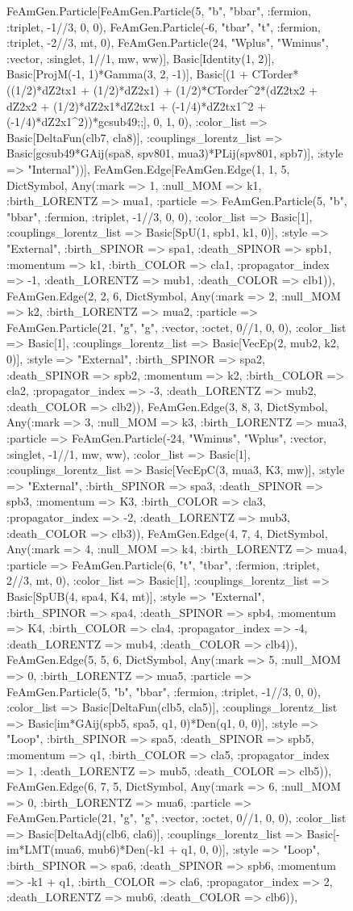\documentclass{revtex4}
\begin{document}
\begin{figure}[!htb]
\begin{center}
{FeAmGen.Particle[FeAmGen.Particle(5, "b", "bbar", :fermion, :triplet, -1//3, 0, 0), FeAmGen.Particle(-6, "tbar", "t", :fermion, :triplet, -2//3, mt, 0), FeAmGen.Particle(24, "Wplus", "Wminus", :vector, :singlet, 1//1, mw, ww)], Basic[Identity(1, 2)], Basic[ProjM(-1, 1)*Gamma(3, 2, -1)], Basic[(1 + CTorder*((1/2)*dZ2tx1 + (1/2)*dZ2x1) + (1/2)*CTorder^2*(dZ2tx2 + dZ2x2 + (1/2)*dZ2x1*dZ2tx1 + (-1/4)*dZ2tx1^2 + (-1/4)*dZ2x1^2))*gcsub49;;], 0, 1, 0), :color_list => Basic[DeltaFun(clb7, cla8)], :couplings_lorentz_list => Basic[gcsub49*GAij(spa8, spv801, mua3)*PLij(spv801, spb7)], :style => "Internal"))], FeAmGen.Edge[FeAmGen.Edge(1, 1, 5, Dict{Symbol, Any}(:mark => 1, :null_MOM => k1, :birth_LORENTZ => mua1, :particle => FeAmGen.Particle(5, "b", "bbar", :fermion, :triplet, -1//3, 0, 0), :color_list => Basic[1], :couplings_lorentz_list => Basic[SpU(1, spb1, k1, 0)], :style => "External", :birth_SPINOR => spa1, :death_SPINOR => spb1, :momentum => k1, :birth_COLOR => cla1, :propagator_index => -1, :death_LORENTZ => mub1, :death_COLOR => clb1)), FeAmGen.Edge(2, 2, 6, Dict{Symbol, Any}(:mark => 2, :null_MOM => k2, :birth_LORENTZ => mua2, :particle => FeAmGen.Particle(21, "g", "g", :vector, :octet, 0//1, 0, 0), :color_list => Basic[1], :couplings_lorentz_list => Basic[VecEp(2, mub2, k2, 0)], :style => "External", :birth_SPINOR => spa2, :death_SPINOR => spb2, :momentum => k2, :birth_COLOR => cla2, :propagator_index => -3, :death_LORENTZ => mub2, :death_COLOR => clb2)), FeAmGen.Edge(3, 8, 3, Dict{Symbol, Any}(:mark => 3, :null_MOM => k3, :birth_LORENTZ => mua3, :particle => FeAmGen.Particle(-24, "Wminus", "Wplus", :vector, :singlet, -1//1, mw, ww), :color_list => Basic[1], :couplings_lorentz_list => Basic[VecEpC(3, mua3, K3, mw)], :style => "External", :birth_SPINOR => spa3, :death_SPINOR => spb3, :momentum => K3, :birth_COLOR => cla3, :propagator_index => -2, :death_LORENTZ => mub3, :death_COLOR => clb3)), FeAmGen.Edge(4, 7, 4, Dict{Symbol, Any}(:mark => 4, :null_MOM => k4, :birth_LORENTZ => mua4, :particle => FeAmGen.Particle(6, "t", "tbar", :fermion, :triplet, 2//3, mt, 0), :color_list => Basic[1], :couplings_lorentz_list => Basic[SpUB(4, spa4, K4, mt)], :style => "External", :birth_SPINOR => spa4, :death_SPINOR => spb4, :momentum => K4, :birth_COLOR => cla4, :propagator_index => -4, :death_LORENTZ => mub4, :death_COLOR => clb4)), FeAmGen.Edge(5, 5, 6, Dict{Symbol, Any}(:mark => 5, :null_MOM => 0, :birth_LORENTZ => mua5, :particle => FeAmGen.Particle(5, "b", "bbar", :fermion, :triplet, -1//3, 0, 0), :color_list => Basic[DeltaFun(clb5, cla5)], :couplings_lorentz_list => Basic[im*GAij(spb5, spa5, q1, 0)*Den(q1, 0, 0)], :style => "Loop", :birth_SPINOR => spa5, :death_SPINOR => spb5, :momentum => q1, :birth_COLOR => cla5, :propagator_index => 1, :death_LORENTZ => mub5, :death_COLOR => clb5)), FeAmGen.Edge(6, 7, 5, Dict{Symbol, Any}(:mark => 6, :null_MOM => 0, :birth_LORENTZ => mua6, :particle => FeAmGen.Particle(21, "g", "g", :vector, :octet, 0//1, 0, 0), :color_list => Basic[DeltaAdj(clb6, cla6)], :couplings_lorentz_list => Basic[-im*LMT(mua6, mub6)*Den(-k1 + q1, 0, 0)], :style => "Loop", :birth_SPINOR => spa6, :death_SPINOR => spb6, :momentum => -k1 + q1, :birth_COLOR => cla6, :propagator_index => 2, :death_LORENTZ => mub6, :death_COLOR => clb6)), }
\end{center}
\end{figure}
\end{document}
